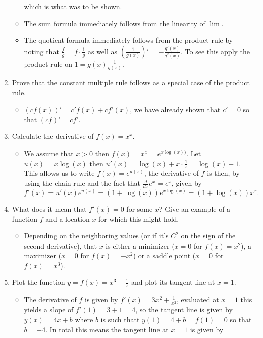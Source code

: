 \documentclass{article}
\begin{document}
\begin{enumerate}
\begin{itemize}
$$	$$
	which is what was to be shown.
	\item The sum formula immediately follows from the linearity of $\lim$.
	\item The quotient formula immediately follows from the product rule by noting that $\frac{f}{g} = f \cdot \frac{1}{g}$ as well as $\left(\frac{1}{g(x)}\right)' = -\frac{g'(x)}{g^2(x)}$. To see this apply the product rule on $1 = g(x) \frac{1}{g(x)}$.
	\end{itemize}
\item Prove that the constant multiple rule follows as a special case of the product rule.
	\begin{itemize}
	\item $(cf(x))' = c' f(x) + c f'(x)$, we have already shown that $c' = 0$ so that $(cf)' = cf'$.
	\end{itemize}
\item Calculate the derivative of $f(x) = x^x$. 
	\begin{itemize}
	\item We assume that $x > 0$ then $f(x) = x^x = e^{x \log(x))}$. Let $u(x) = x \log(x)$ then $u'(x) = \log(x) + x \cdot \frac{1}{x} = \log(x) + 1$. This allows us to write $f(x) = e^{u(x)}$, the derivative of $f$ is then, by using the chain rule and the fact that $\frac{d}{dx} e^x = e^x$, given by
	$$
	f'(x) = u'(x) e^{u(x)} = (1 + \log(x))e^{x \log(x)} = (1 + \log(x))x^x.
	$$
	\end{itemize}
\item What does it mean that $f'(x) = 0$ for some $x$? Give an example of a function $f$ and a location $x$ for which this might hold.
	\begin{itemize}
	\item Depending on the neighboring values (or if it's $C^2$ on the sign of the second derivative), that $x$ is either a minimizer ($x = 0$ for $f(x) = x^2$), a maximizer ($x = 0$ for $f(x) = -x^2$) or a saddle point ($x = 0$ for $f(x) = x^3$).
	\end{itemize}
\item Plot the function $y = f(x) = x^3 - \frac{1}{x}$ and plot its tangent line at $x = 1$.
	\begin{itemize}
	\item The derivative of $f$ is given by $f'(x) = 3x^2 + \frac{1}{x^2}$, evaluated at $x = 1$ this yields a slope of $f'(1) = 3 + 1 = 4$, so the tangent line is given by $y(x) = 4x + b$ where $b$ is such thatt $y(1) = 4 + b = f(1) = 0$ so that $b = -4$. In total this means the tangent line at $x = 1$ is given by

\end{itemize}
\end{enumerate}
\end{document}
